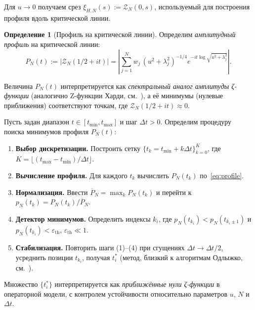 \documentclass{article}
\numberwithin{equation}{section}
\theoremstyle{plain}
\theoremstyle{definition}
\newtheorem{definition}{Определение}
\theoremstyle{remark}
\begin{document}
\noindent
Для $u\to 0$ получаем срез $\xi_{H,N}(s):=\mathcal Z_N(0,s)$, 
используемый для построения профиля вдоль критической линии.

\begin{definition}[Профиль на критической линии]
\label{def:profile}
Определим \emph{амплитудный профиль} на критической линии:
\begin{equation}
\label{eq:profile}
P_N(t):=|\mathcal Z_N(1/2+it)|
=\left|
\sum_{j=1}^{N} w_j\,(u^2+\lambda_j^2)^{-1/4}
e^{-it\log\!\sqrt{u^2+\lambda_j^2}}
\right|.
\end{equation}
\end{definition}

\noindent
Величина $P_N(t)$ интерпретируется как \emph{спектральный аналог амплитуды ζ-функции} (аналогично Z-функции Харди, см.~\cite{Titchmarsh1986}),
а её минимумы (нулевые приближения) соответствуют точкам,
где $\mathcal Z_N(1/2+it)\approx 0$.

\begin{tcolorbox}[colback=gray!5,colframe=gray!40!black,title=Протокол локаторов минимумов]
	Пусть задан диапазон $t \in [t_{\min}, t_{\max}]$ и шаг $\Delta t > 0$.  
	Определим процедуру поиска минимумов профиля $P_N(t)$:
	
	\begin{enumerate}
		\item \textbf{Выбор дискретизации.} Построить сетку $\{t_k=t_{\min}+k\Delta t\}_{k=0}^{K}$, где $K=\lfloor (t_{\max}-t_{\min})/\Delta t \rfloor$.
		\item \textbf{Вычисление профиля.} Для каждого $t_k$ вычислить $P_N(t_k)$ по~\eqref{eq:profile}.
		\item \textbf{Нормализация.} Ввести $\overline{P}_N=\max_k P_N(t_k)$ и перейти к $p_N(t_k)=P_N(t_k)/\overline{P}_N$.
		\item \textbf{Детектор минимумов.} Определить индексы $k_i$, где $p_N(t_{k_i})<p_N(t_{k_i\pm1})$ и $p_N(t_{k_i})<\varepsilon_{\mathrm{th}}$, $\varepsilon_{\mathrm{th}}\ll1$.
		\item \textbf{Стабилизация.} Повторить шаги (1)–(4) при сгущениях $\Delta t\to\Delta t/2$, усреднить позиции $t_{k_i}$, получая $t_i^\ast$ (метод, близкий к алгоритмам Одлыжко, см.~\cite{Odlyzko1988}).
	\end{enumerate}
\end{tcolorbox}


\noindent
Множество $\{t_i^\ast\}$ интерпретируется как \emph{приближённые нули ζ-функции} в операторной модели, 
с контролем устойчивости относительно параметров $u$, $N$ и $\Delta t$.
\end{document}
